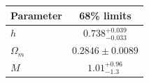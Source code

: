 \begin{tabular} { l  c}

 Parameter &  68\% limits\\
\hline
{\boldmath$h              $} & $0.738^{+0.039}_{-0.033}   $\\

{\boldmath$Ω_m            $} & $0.2846\pm 0.0089          $\\

{\boldmath$M              $} & $1.01^{+0.96}_{-1.3}       $\\
\hline
\end{tabular}